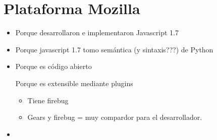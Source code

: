 \documentclass[a4paper]{report}
\begin{document}
\appendix




\chapter{Plataforma Mozilla}
\begin{itemize}
  \item Porque desarrollaron e implementaron Javascript 1.7
  \item Porque javascript 1.7 tomo semántica (y sintaxis???) de Python
  \item Porque es código abierto
  \begin{item}
  	Porque es extensible mediante plugins
  	\begin{itemize}
        \item Tiene firebug
        \item Gears y firebug = muy compardor para el desarrollador.
     \end{itemize}
      
  \end{item}
  \item 
\end{itemize}

\begin{thebibliography}{99}
 
\end{thebibliography}

\printglossary
{}
\end{document}
